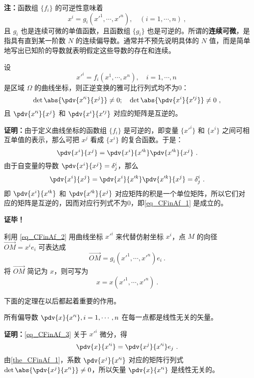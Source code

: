 \textbf{注：}函数组 $\{f_i\}$ 的可逆性意味着
\begin{equation}\label{eq_CFinAf_2}
x^i=g_i(x'^1,\cdots,x'^n),\quad (i=1,\cdots,n)~,
\end{equation}
且 $g_i$ 也是连续可微的单值函数，且函数组 $\{g_i\}$ 也是可逆的。所谓的\textbf{连续可微}，是指具有直到某一阶数 $N$ 的连续偏导数。通常并不预先说明具体的 $N$ 值，而是简单地写出已知阶的导数就表明假定这些导数的存在和连续。
\begin{theorem}{}\label{the_CFinAf_1}
设
\begin{equation}
x'^i=f_i(x^1,\cdots,x^n),\quad i=1,\cdots,n~
\end{equation}
是区域 $\Omega$ 的曲线坐标，则正逆变换的雅可比行列式均不为0：
\begin{equation}\label{eq_CFinAf_1}
\det\abs{\pdv{x'^i}{x^j}}\neq0;\quad\det\abs{\pdv{x^i}{x'^j}}\neq0~,
\end{equation}
且 $\pdv{x'^i}{x^j}$ 和 $\pdv{x^i}{x'^j}$ 对应的矩阵是互逆的。
\end{theorem}
\textbf{证明：}由于定义曲线坐标的函数组 $\{f_i\}$ 是可逆的，即变量 $\{x'^i\}$ 和 $\{x^i\}$ 之间可相互单值的表示，那么可把 $x^j$ 看成 $\{x^i\}$ 的复合函数。于是：
\begin{equation}
\pdv{x^i}{x^j}=\pdv{x^i}{x'^k}\pdv{x'^k}{x^j}~.
\end{equation}
由于自变量的导数 $\pdv{x^i}{x^j}=\delta^i_j$，那么
\begin{equation}
\pdv{x^i}{x^j}=\pdv{x^i}{x'^k}\pdv{x'^k}{x^j}=\delta^i_j~.
\end{equation}
即 $\pdv{x^i}{x'^k}$ 和 $\pdv{x'^k}{x^j}$ 对应矩阵的积是一个单位矩阵，所以它们对应的矩阵是互逆的，因而对应行列式不为0，即\autoref{eq_CFinAf_1} 是成立的。

 
\textbf{证毕！}

利用 \autoref{eq_CFinAf_2} 用曲线坐标 $x'^i$ 来代替仿射坐标 $x^i$，点 $M$ 的向径 $\overrightarrow {OM}=x^i e_i$ 可表达成
\begin{equation}\label{eq_CFinAf_3}
\overrightarrow{OM}=g_i(x'^1,\cdots,x'^n)e_i~.
\end{equation}
将 $\overrightarrow{OM}$ 简记为 $x$，则可写为
\begin{equation}
x=x(x'^1,\cdots,x'^n)~.
\end{equation}


下面的定理在以后都起着重要的作用。
\begin{theorem}{}\label{the_CFinAf_2}
所有偏导数 $\pdv{x}{x'^i},i=1,\cdots,n$ 在每一点都是线性无关的矢量。
\end{theorem}
\textbf{证明：}\autoref{eq_CFinAf_3} 关于 $x'^i$ 微分，得
\begin{equation}
\pdv{x}{x'^i}=\pdv{x^j}{x'^i}e_j~.
\end{equation}
由\autoref{the_CFinAf_1}，系数 $\pdv{x^j}{x'^i}$ 对应的矩阵行列式 $\det\abs{\pdv{x^j}{x'^i}}\neq0$，所以矢量 $\pdv{x}{x'^i}$ 是线性无关的。


